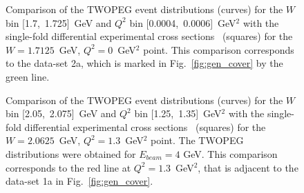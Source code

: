 \begin{figure}[!ht]
\begin{center}
\end{center}
\vspace{-0.6cm}
\caption{\small Comparison of the TWOPEG event distributions (curves) for the $W$ bin [1.7,~1.725]~GeV and $Q^2$ bin [0.0004,~0.0006]~GeV$^2$ with the single-fold differential experimental cross sections~\cite{Golovach:note} (squares) for the $W = 1.7125$~GeV, $Q^2 = 0$~GeV$^2$ point. This comparison corresponds to the data-set 2a, which is marked in Fig.~\ref{fig:gen_cover} by the green line.}
\label{fig:eg_gol_17125}
\end{figure}



\begin{figure}[!ht]
\begin{center}
\end{center}
\vspace{-0.6cm}
\caption{\small Comparison of the TWOPEG event distributions (curves) for the $W$ bin [2.05,~2.075]~GeV and $Q^2$ bin [1.25,~1.35]~GeV$^2$ with the single-fold differential experimental cross sections~\cite{Ripani:2002ss} (squares) for the $W = 2.0625$~GeV, $Q^2 = 1.3$~GeV$^2$ point. The TWOPEG distributions were obtained for $E_{beam} = 4$ GeV. This comparison corresponds to the red line at $Q^2 = 1.3$~GeV$^2$, that is adjacent to the data-set 1a in Fig.~\ref{fig:gen_cover}.}
\label{fig:eg_rip_130_20625}
\end{figure}

